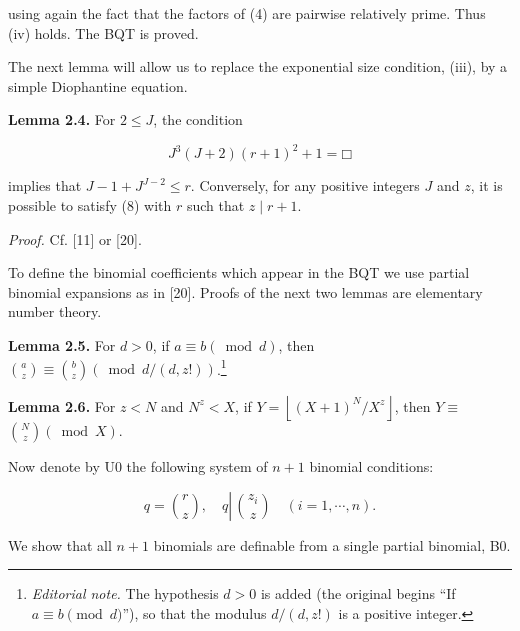 \documentclass[11pt,a4paper]{article}
\newcommand{\ednote}[1]{\footnote{\textit{Editorial note.} #1}}
\newcommand{\square}{\mdlgwhtsquare}
\begin{document}
using again the fact that the factors of (4) are pairwise relatively prime. Thus (iv) holds. The BQT is proved.

The next lemma will allow us to replace the exponential size condition, (iii), by a simple Diophantine equation.

\par{}\medskip\noindent\textbf{Lemma 2.4.} For $2 \leq J$, the condition


\begin{equation*}
J^{3}(J+2)(r+1)^{2}+1=\square \tag{8}
\end{equation*}


implies that $J-1+J^{J-2} \leq r$. Conversely, for any positive integers $J$ and $z$, it is possible to satisfy (8) with $r$ such that $z \mid r+1$.

\noindent\textit{Proof.} Cf. [11] or [20].


To define the binomial coefficients which appear in the BQT we use partial binomial expansions as in [20]. Proofs of the next two lemmas are elementary number theory.

\par{}\medskip\noindent\textbf{Lemma 2.5.} For $d>0$, if $a \equiv b(\bmod d)$, then $\binom{a}{z} \equiv\binom{b}{z}(\bmod d /(d, z!))$.\ednote{The hypothesis $d>0$ is added (the original begins ``If $a\equiv b\pmod d$''), so that the modulus $d/(d,z!)$ is a positive integer.}

\par{}\medskip\noindent\textbf{Lemma 2.6.} For $z<N$ and $N^{z}<X$, if $Y=\left\lfloor (X+1)^N/X^z\right\rfloor$, then $Y \equiv$ $\binom{N}{z}(\bmod X)$.

Now denote by U0 the following system of $n+1$ binomial conditions:


\begin{equation*}
q=\binom{r}{z}, \quad q \left\lvert\,\binom{ z_{i}}{z} \quad(i=1, \cdots, n) .\right. \tag{U0}
\end{equation*}


We show that all $n+1$ binomials are definable from a single partial binomial, B0.
\end{document}
